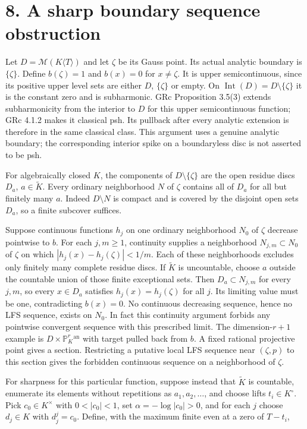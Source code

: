 \documentclass[11pt]{article}
\begin{document}
\section*{8. A sharp boundary sequence obstruction}

Let $D=\mathcal M(K\langle T\rangle)$ and let $\zeta$ be its Gauss point. Its actual analytic boundary is $\{\zeta\}$. Define $b(\zeta)=1$ and $b(x)=0$ for $x\neq\zeta$. It is upper semicontinuous, since its positive upper level sets are either $D$, $\{\zeta\}$ or empty. On $\operatorname{Int}(D)=D\setminus\{\zeta\}$ it is the constant zero and is subharmonic. GRc Proposition 3.5(3) extends subharmonicity from the interior to $D$ for this upper semicontinuous function; GRc 4.1.2 makes it classical psh. Its pullback after every analytic extension is therefore in the same classical class. This argument uses a genuine analytic boundary; the corresponding interior spike on a boundaryless disc is not asserted to be psh.

For algebraically closed $K$, the components of $D\setminus\{\zeta\}$ are the open residue discs $D_a$, $a\in\widetilde K$. Every ordinary neighborhood $N$ of $\zeta$ contains all of $D_a$ for all but finitely many $a$. Indeed $D\setminus N$ is compact and is covered by the disjoint open sets $D_a$, so a finite subcover suffices.

Suppose continuous functions $h_j$ on one ordinary neighborhood $N_0$ of $\zeta$ decrease pointwise to $b$. For each $j,m\geq1$, continuity supplies a neighborhood $N_{j,m}\subset N_0$ of $\zeta$ on which $|h_j(x)-h_j(\zeta)|<1/m$. Each of these neighborhoods excludes only finitely many complete residue discs. If $\widetilde K$ is uncountable, choose $a$ outside the countable union of those finite exceptional sets. Then $D_a\subset N_{j,m}$ for every $j,m$, so every $x\in D_a$ satisfies $h_j(x)=h_j(\zeta)$ for all $j$. Its limiting value must be one, contradicting $b(x)=0$. No continuous decreasing sequence, hence no LFS sequence, exists on $N_0$. In fact this continuity argument forbids any pointwise convergent sequence with this prescribed limit. The dimension-$r+1$ example is $D\times\mathbb P^r_K{}^{\mathrm{an}}$ with target pulled back from $b$. A fixed rational projective point gives a section. Restricting a putative local LFS sequence near $(\zeta,p)$ to this section gives the forbidden continuous sequence on a neighborhood of $\zeta$.

For sharpness for this particular function, suppose instead that $\widetilde K$ is countable, enumerate its elements without repetitions as $a_1,a_2,\ldots$, and choose lifts $t_i\in K^\circ$. Pick $c_0\in K^\times$ with $0<|c_0|<1$, set $\alpha=-\log|c_0|>0$, and for each $j$ choose $d_j\in K$ with $d_j^j=c_0$. Define, with the maximum finite even at a zero of $T-t_i$,
\end{document}
